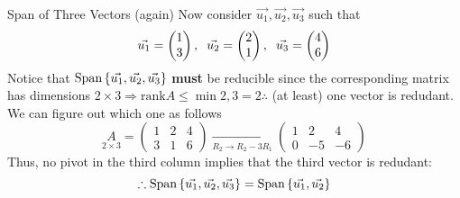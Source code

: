 \begin{example}{Span of Three Vectors (again)}
    Now consider $\vec{u_1}, \vec{u_2}, \vec{u_3}$ such that 
    \[
        \vec{u_1} = \begin{pmatrix}
            1 \\ 3
        \end{pmatrix}, 
        \hspace{0.2cm}
        \vec{u_2} = \begin{pmatrix}
            2 \\ 1
        \end{pmatrix}, 
        \hspace{0.2cm}
        \vec{u_3} = \begin{pmatrix}
            4 \\ 6
        \end{pmatrix}
    \]
    Notice that $\text{Span}\left\{\vec{u_1}, \vec{u_2}, \vec{u_3} \right\}$ \textbf{must} be reducible since the corresponding matrix has dimensions $2 \times 3 \Rightarrow \text{rank}{A} \leq \min{2, 3} = 2 \therefore$ (at least) one vector is redudant. We can figure out which one as follows 
    \[
        \underset{2 \times 3}{A} = \begin{pmatrix}
            1 & 2 & 4 \\
            3 & 1 & 6 
        \end{pmatrix}
        \xrightarrow[R_2 \to R_2 - 3R_1]{}
        \begin{pmatrix}
            1 & 2 & 4 \\
            0 & -5 & -6
        \end{pmatrix}
    \]
    Thus, no pivot in the third column implies that the third vector is redudant:
    \[\therefore \text{Span}\left\{\vec{u_1}, \vec{u_2}, \vec{u_3} \right\} = \text{Span}\left\{\vec{u_1}, \vec{u_2} \right\}\]
\end{example}

